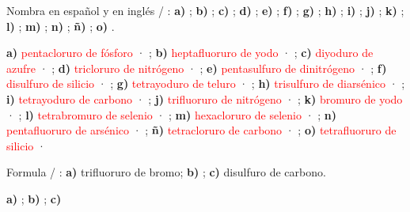 \begin{exercise}
    Nombra en español y en inglés / : \textbf{a)} ; \textbf{b)} ; \textbf{c)} ; \textbf{d)} ; \textbf{e)} ; \textbf{f)} ; \textbf{g)} ; \textbf{h)} ; \textbf{i)} ; \textbf{j)} ; \textbf{k)} ; \textbf{l)} ; \textbf{m)} ; \textbf{n)} ; \textbf{ñ)} ; \textbf{o)} .
    \begin{solu}
        \textbf{a)} \textcolor{red}{pentacloruro de fósforo} · \textcolor{red}{}; \textbf{b)} \textcolor{red}{heptafluoruro de yodo} · \textcolor{red}{}; \textbf{c)} \textcolor{red}{diyoduro de azufre} · \textcolor{red}{}; \textbf{d)} \textcolor{red}{tricloruro de nitrógeno} · \textcolor{red}{}; \textbf{e)} \textcolor{red}{pentasulfuro de dinitrógeno} · \textcolor{red}{}; \textbf{f)} \textcolor{red}{disulfuro de silicio} · \textcolor{red}{}; \textbf{g)} \textcolor{red}{tetrayoduro de teluro} · \textcolor{red}{}; \textbf{h)} \textcolor{red}{trisulfuro de diarsénico} · \textcolor{red}{}; \textbf{i)} \textcolor{red}{tetrayoduro de carbono} · \textcolor{red}{}; \textbf{j)} \textcolor{red}{trifluoruro de nitrógeno} · \textcolor{red}{}; \textbf{k)} \textcolor{red}{bromuro de yodo} · \textcolor{red}{}; \textbf{l)} \textcolor{red}{tetrabromuro de selenio} · \textcolor{red}{}; \textbf{m)} \textcolor{red}{hexacloruro de selenio} · \textcolor{red}{}; \textbf{n)} \textcolor{red}{pentafluoruro de arsénico} · \textcolor{red}{}; \textbf{ñ)} \textcolor{red}{tetracloruro de carbono} · \textcolor{red}{}; \textbf{o)} \textcolor{red}{tetrafluoruro de silicio} · \textcolor{red}{}
    \end{solu}
\end{exercise}

\begin{exercise}
    Formula / : \textbf{a)} trifluoruro de bromo; \textbf{b)} ; \textbf{c)} disulfuro de carbono.
    \begin{solu}
        \textbf{a)} \textcolor{red}{}; \textbf{b)} \textcolor{red}{}; \textbf{c)} \textcolor{red}{}
    \end{solu}
\end{exercise}

